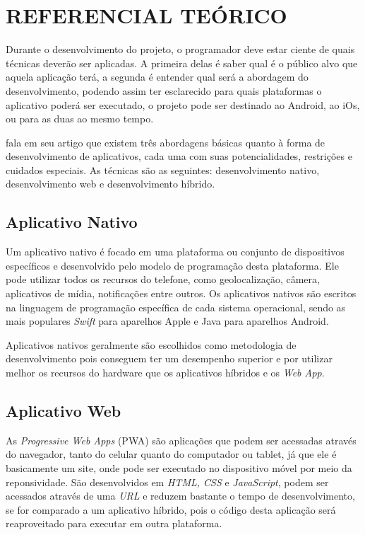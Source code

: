 
\chapter{REFERENCIAL TEÓRICO}
\label{chap:ref_teo}


Durante o desenvolvimento do projeto, o programador deve estar ciente de quais técnicas deverão ser aplicadas. A primeira delas é saber qual é o público alvo que aquela aplicação terá, a segunda é entender qual será a abordagem do desenvolvimento, podendo assim ter esclarecido para quais plataformas o aplicativo poderá ser executado, o projeto pode ser destinado ao Android, ao iOs, ou para as duas ao mesmo tempo.

 fala em seu artigo que existem três abordagens básicas quanto à forma de desenvolvimento de aplicativos, cada uma com suas potencialidades, restrições e cuidados especiais. As técnicas são as seguintes: desenvolvimento nativo, desenvolvimento web e desenvolvimento híbrido.

\section{Aplicativo Nativo}

Um aplicativo nativo é focado em uma plataforma ou conjunto de dispositivos específicos e desenvolvido pelo modelo de programação desta plataforma. Ele pode utilizar todos os recursos do telefone, como geolocalização, câmera, aplicativos de mídia, notificações entre outros. Os aplicativos nativos são escritos na linguagem de programação específica de cada sistema operacional, sendo as mais populares \textit{Swift} para aparelhos Apple e Java para aparelhos Android. \cite{apps}

Aplicativos nativos geralmente são escolhidos como metodologia de desenvolvimento pois conseguem ter um desempenho superior e por utilizar melhor os recursos do hardware que os aplicativos híbridos e os \textit{Web App}.


\section{Aplicativo Web}
As \textit{Progressive Web Apps} (PWA) são aplicações que podem ser acessadas através do navegador, tanto do celular quanto do computador ou tablet, já que ele é basicamente um site, onde pode ser executado no dispositivo móvel por meio da reponsividade. São desenvolvidos em \textit{HTML, CSS} e \textit{JavaScript}, podem ser acessados através de uma \textit{URL} e reduzem bastante o tempo de desenvolvimento, se for comparado a um aplicativo híbrido, pois o código desta aplicação será reaproveitado para executar em outra plataforma. \cite{apps}


